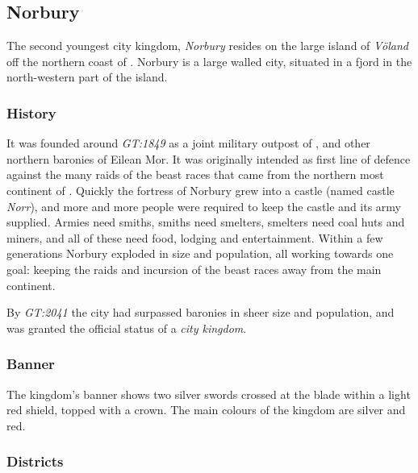 \clearpage

\subsection{Norbury}
\label{sec:Norbury}


The second youngest city kingdom, \emph{Norbury} resides on the large island
of \emph{Völand} off the northern coast of . Norbury
is a large walled city, situated in a fjord in the north-western part of the
island.

\subsubsection{History}

It was founded around \emph{GT:1849} as a joint military outpost of
, and other northern baronies of Eilean Mor. It was
originally intended as first line of defence against the many raids of the
beast races that came from the northern most continent of
. Quickly the fortress of Norbury grew into a castle
(named castle \emph{Norr}), and more and more people were required to keep the
castle and its army supplied. Armies need smiths, smiths need smelters,
smelters need coal huts and miners, and all of these need food, lodging and
entertainment. Within a few generations Norbury exploded in size and
population, all working towards one goal: keeping the raids and incursion of
the beast races away from the main continent.

By \emph{GT:2041} the city had surpassed baronies in sheer size and population,
and was granted the official status of a \emph{city kingdom}.

\subsubsection{Banner}

The kingdom's banner shows two silver swords crossed at the blade within a
light red shield, topped with a crown. The main colours of the kingdom are
silver and red.

\subsubsection{Districts}

